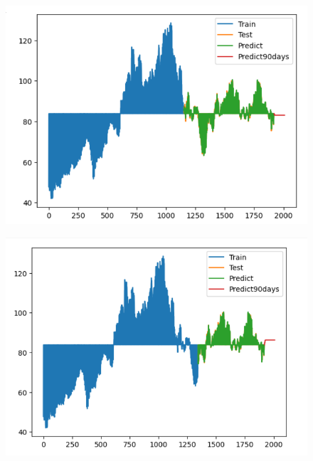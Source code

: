 \documentclass{article}
\begin{document}
\begin{multicols}{2}
\begin{figure}[H]
    \centering
    \begin{minipage}{0.15\textwidth}
    \centering
    \includegraphics[width=1\textwidth]{Image/GradientBoosting/SONY_90_6_4_GradientBoostingRegressor.png}
   
    \label{fig:1}
    \end{minipage}%
    \begin{minipage}{0.15\textwidth}
    \centering
    \includegraphics[width=1\textwidth]{Image/GradientBoosting/SONY_90_7_3_GradientBoostingRegressor.png}
  

\end{minipage}
\end{figure}
\end{multicols}
\end{document}
